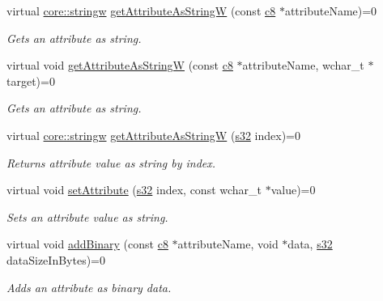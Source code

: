 \begin{DoxyCompactItemize}
virtual \hyperlink{namespaceirr_1_1core_a5aedb62cb47cf01d1c548ab5e6344d2d}{core\+::stringw} \hyperlink{classirr_1_1io_1_1IAttributes_a874219751c3a52d781cdfa372cd8bcf5}{get\+Attribute\+As\+StringW} (const \hyperlink{namespaceirr_a9395eaea339bcb546b319e9c96bf7410}{c8} $\ast$attribute\+Name)=0
\begin{DoxyCompactList}\small\item\em Gets an attribute as string. \end{DoxyCompactList}\item 
virtual void \hyperlink{classirr_1_1io_1_1IAttributes_a972aca66779e767e635a1c52b1559382}{get\+Attribute\+As\+StringW} (const \hyperlink{namespaceirr_a9395eaea339bcb546b319e9c96bf7410}{c8} $\ast$attribute\+Name, wchar\+\_\+t $\ast$target)=0
\begin{DoxyCompactList}\small\item\em Gets an attribute as string. \end{DoxyCompactList}\item 
virtual \hyperlink{namespaceirr_1_1core_a5aedb62cb47cf01d1c548ab5e6344d2d}{core\+::stringw} \hyperlink{classirr_1_1io_1_1IAttributes_a60ab65d3d3e123af2b2d47b1bd48f771}{get\+Attribute\+As\+StringW} (\hyperlink{namespaceirr_ac66849b7a6ed16e30ebede579f9b47c6}{s32} index)=0
\begin{DoxyCompactList}\small\item\em Returns attribute value as string by index. \end{DoxyCompactList}\item 
virtual void \hyperlink{classirr_1_1io_1_1IAttributes_a679ae0badc391b6814db9cd7cf3d45bc}{set\+Attribute} (\hyperlink{namespaceirr_ac66849b7a6ed16e30ebede579f9b47c6}{s32} index, const wchar\+\_\+t $\ast$value)=0
\begin{DoxyCompactList}\small\item\em Sets an attribute value as string. \end{DoxyCompactList}\item 
\mbox{\label{classirr_1_1io_1_1IAttributes_a71b20b390b0c02324123f1cd2ea0b66f}} 
virtual void \hyperlink{classirr_1_1io_1_1IAttributes_a71b20b390b0c02324123f1cd2ea0b66f}{add\+Binary} (const \hyperlink{namespaceirr_a9395eaea339bcb546b319e9c96bf7410}{c8} $\ast$attribute\+Name, void $\ast$data, \hyperlink{namespaceirr_ac66849b7a6ed16e30ebede579f9b47c6}{s32} data\+Size\+In\+Bytes)=0
\begin{DoxyCompactList}\small\item\em Adds an attribute as binary data. \end{DoxyCompactList}\item 

\end{DoxyCompactItemize}
